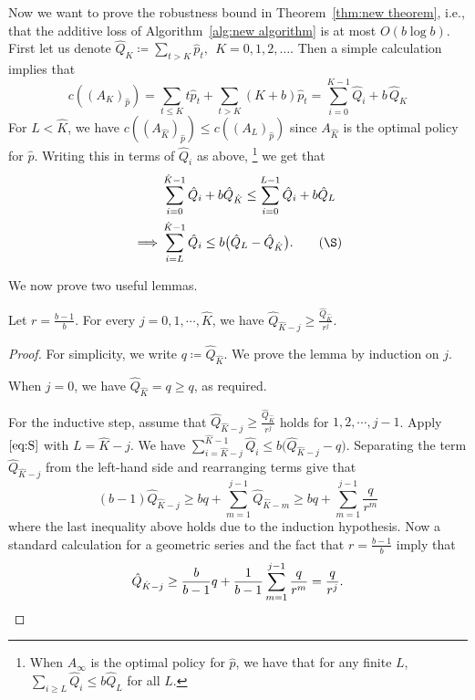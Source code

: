 Now we want to prove the robustness bound in Theorem~\ref{thm:new theorem}, i.e., that the additive loss of Algorithm~\ref{alg:new algorithm} is at most $O(b \log b)$.  First let us denote $\hat{Q}_K \coloneqq \sum_{t>K} \hat{p}_t, \ \ K=0,1,2,\dots$. Then a simple calculation implies that  
\[
c((A_K)_{\hat{p}})
= \sum_{t \leq K} t\hat{p}_t + \sum_{t>K} (K + b)\hat{p}_t
= \sum_{i=0}^{K-1} \hat{Q}_i + b \, \hat{Q}_K
\tag{$\triangle$}
\label{eq:triangle}
\]
For $L<\hat{K}$, we have $c((A_{\hat{K}})_{\hat{p}}) \leq c((A_{L})_{\hat{p}})$ since $A_{\hat{K}}$ is the optimal policy for $\hat{p}$. Writing this in terms of $\hat{Q}_i$ as above, \footnote{When $A_\infty$ is the optimal policy for $\hat{p}$, we have that for any finite $L$, $\sum_{i \geq L}\hat{Q}_i \leq b \hat{Q}_L$ for all $L$.} we get that 
\begin{align}
&\sum_{i=0}^{\hat K -1} \hat Q_i + b \hat Q_{\hat K} \leq \sum_{i=0}^{L-1} \hat Q_i + b \hat Q_L \notag \\
\implies &\sum_{i=L}^{\hat{K}-1} \hat{Q}_i \leq b \bigl(\hat{Q}_L - \hat{Q}_{\hat{K}}\bigr).
\tag{$\S$}\label{eq:S}
\end{align}

We now prove two useful lemmas.

\begin{lemma}
    \label{lm:tail mass after hat(K)-j}
    Let $r = \frac{b-1}{b}$. For every $j=0,1,\cdots,\hat{K}$, we have $\hat{Q}_{\hat{K}-j} \geq \frac{\hat{Q}_{\hat{K}}}{r^j}$.
\end{lemma}

\begin{proof}
    For simplicity, we write $q \coloneqq \hat{Q}_{\hat{K}}$. We prove the lemma by induction on $j$.
    
    When $j=0$, we have $\hat{Q}_{\hat{K}} = q \geq q$, as required.

    For the inductive step, assume that $\hat{Q}_{\hat{K}-j} \geq \frac{\hat{Q}_{\hat{K}}}{r^j}$ holds for $1,2,\cdots, j-1$. Apply $\eqref{eq:S}$ with $L = \hat{K} - j$. We have $\sum_{i=\hat{K}-j}^{\hat{K}-1} \hat{Q}_i \leq b \bigl(\hat{Q}_{\hat{K}-j} - q\bigr)$. Separating the term $\hat{Q}_{\hat{K}-j}$ from the left-hand side and rearranging terms give that
    \[(b-1)\hat{Q}_{\hat{K}-j} \geq  bq+ \sum_{m=1}^{j-1} \hat{Q}_{\hat{K}-m} \geq bq + \sum_{m=1}^{j-1} \frac{q}{r^m}\]
    where the last inequality above holds due to the induction hypothesis. Now a standard calculation for a geometric series and the fact that $r = \frac{b-1}{b}$ imply that 
    \[\hat{Q}_{\hat{K}-j} \geq \frac{b}{b-1} q + \frac{1}{b-1} \sum_{m=1}^{j-1} \frac{q}{r^m} = \frac{q}{r^j}. \qedhere\]
\end{proof}

